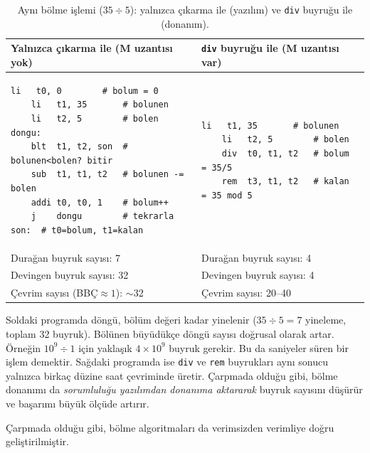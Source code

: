 \begin{table}[htbp]
\centering
\caption[Yazılım ve donanım bölme karşılaştırması]{Aynı bölme işlemi ($35 \div 5$): yalnızca çıkarma ile (yazılım) ve \texttt{div} buyruğu ile (donanım).}
\label{tab:bolme-yazilim-donanim}
\small
\begin{tabular}{p{6.8cm}p{6.8cm}}
\toprule
\textbf{Yalnızca çıkarma ile (M uzantısı yok)} & \textbf{\texttt{div} buyruğu ile (M uzantısı var)} \\
\midrule
\begin{minipage}[t]{6.5cm}
\begin{lstlisting}[style=riscv, xleftmargin=0pt]
    li   t0, 0        # bolum = 0
    li   t1, 35       # bolunen
    li   t2, 5        # bolen
dongu:
    blt  t1, t2, son  # bolunen<bolen? bitir
    sub  t1, t1, t2   # bolunen -= bolen
    addi t0, t0, 1    # bolum++
    j    dongu        # tekrarla
son:  # t0=bolum, t1=kalan
\end{lstlisting}
\end{minipage}
&
\begin{minipage}[t]{6.5cm}
\begin{lstlisting}[style=riscv, xleftmargin=0pt]
    li   t1, 35       # bolunen
    li   t2, 5        # bolen
    div  t0, t1, t2   # bolum = 35/5
    rem  t3, t1, t2   # kalan = 35 mod 5
\end{lstlisting}
\end{minipage}
\\
\midrule
Durağan buyruk sayısı: 7 & Durağan buyruk sayısı: 4 \\
Devingen buyruk sayısı: 32 & Devingen buyruk sayısı: 4 \\
Çevrim sayısı (BBÇ${}\approx 1$): $\sim$32 & Çevrim sayısı: 20--40 \\
\bottomrule
\end{tabular}
\end{table}

Soldaki programda döngü, bölüm değeri kadar yinelenir ($35 \div 5 = 7$ yineleme, toplam 32 buyruk). Bölünen büyüdükçe döngü sayısı doğrusal olarak artar. Örneğin $10^9 \div 1$ için yaklaşık $4 \times 10^9$ buyruk gerekir. Bu da saniyeler süren bir işlem demektir. Sağdaki programda ise \texttt{div} ve \texttt{rem} buyrukları aynı sonucu yalnızca birkaç düzine saat çevriminde üretir. Çarpmada olduğu gibi, bölme donanımı da \emph{sorumluluğu yazılımdan donanıma aktararak} buyruk sayısını düşürür ve başarımı büyük ölçüde artırır.

Çarpmada olduğu gibi, bölme algoritmaları da verimsizden verimliye doğru geliştirilmiştir.

